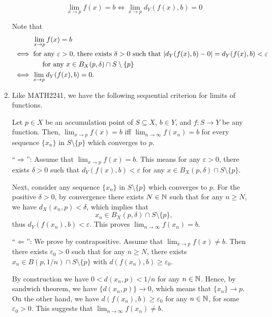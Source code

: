 \begin{enumerate}
\[
\lim_{x\to p}f(x)=b\iff \lim_{x\to p}d_Y(f(x),b)=0
\]
\begin{pf}
Note that
\begin{align*}
&\hspace{1cm}\lim_{x\to p}f(x)=b\\
&\iff \text{for any \(\varepsilon>0\), there exists \(\delta>0\) such that \(|d_Y(f(x),b)-0|=d_Y(f(x),b)<\varepsilon
\)}\\
&\hspace{1.5cm}\text{for any \(x\in B_X(p,\delta)\cap S\setminus\{p\}\)}\\
&\iff \lim_{x\to p}d_Y(f(x),b)=0.
\end{align*}
\end{pf}

\item Like MATH2241, we have the following sequential criterion for limits of
functions.
\begin{proposition}
\label{prp:lim-seq-crit}
Let \(p\in X\) be an accumulation point of \(S\subseteq X\), \(b\in Y\), and
\(f:S\to Y\) be any function. Then, \(\lim_{x\to p}f(x)=b\) iff
\(\lim_{n\to \infty}f(x_n)=b\) for every sequence \(\{x_n\}\) in
\(S\setminus\{p\}\) which converges to \(p\).
\end{proposition}
\begin{pf}
``\(\Rightarrow\)'': Assume that \(\lim_{x\to p}f(x)=b\). This
means for any \(\varepsilon>0\), there exists \(\delta>0\) such that
\(d_Y(f(x),b)<\varepsilon\) for any \(x\in B_X(p,\delta)\cap S\setminus\{p\}\).

Next, consider any sequence \(\{x_n\}\) in \(S\setminus \{p\}\) which converges
to \(p\). For the positive \(\delta>0\), by convergence there exists \(N\in\mathbb{N}\)
such that for any \(n\ge N\), we have \(d_X(x_n,p)<\delta\), which implies that
\[
x_n\in B_X(p,\delta)\cap S\setminus \{p\},
\]
thus \(d_Y(f(x_n),b)<\varepsilon\). This proves \(\lim_{n\to \infty}f(x_n)=b\).

``\(\Leftarrow\)'': We prove by contrapositive. Assume that \(\lim_{x\to
p}f(x)\ne b\). Then there exists \(\varepsilon_0>0\) such that for any \(n\ge
N\), there exists \(x_n\in B(p,1/n)\cap S\setminus \{p\}\) with
\(d(f(x_n),b)\ge \varepsilon_0\).

By construction we have \(0<d(x_n,p)<1/n\) for any \(n\in\mathbb{N}\). Hence, by
sandwich theorem, we have \(\{d(x_n,p)\}\to 0\), which means that \(\{x_n\}\to
p\).  On the other hand, we have \(d(f(x_n),b)\ge \varepsilon_0\) for any
\(n\in\mathbb{N}\), for some \(\varepsilon_0>0\). This suggests that \(\lim_{n\to
\infty}f(x_n)\ne b\).
\end{pf}


\end{enumerate}
